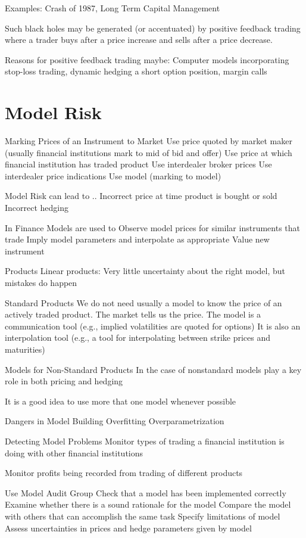 	Examples: Crash of 1987, Long Term Capital Management
	
	Such black holes may be generated (or accentuated) by positive feedback trading where a trader buys after a price increase and sells after a price decrease.
	
	Reasons for positive feedback trading maybe: Computer models incorporating stop-loss trading, dynamic hedging a short option position, margin calls


\section{Model Risk}

Marking Prices of an Instrument to Market
	Use price quoted by market maker (usually financial institutions mark to mid of bid and offer)
	Use price at which financial institution has traded product
	Use interdealer broker prices
	Use interdealer price indications
	Use model (marking to model)


Model Risk can lead to ..
	Incorrect price at time product is bought or sold
	Incorrect hedging


In Finance Models are used to 
	Observe model prices for similar instruments that trade
	Imply model parameters and interpolate as appropriate
	Value new instrument


Products
	Linear products: Very little uncertainty about the right model, but mistakes do happen
	
	Standard Products
		We do not need usually a model to know the price of an actively traded product. The market tells us the price.
		The model is a communication tool (e.g., implied volatilities are quoted for options)
		It is also an interpolation tool (e.g., a tool for interpolating between strike prices and maturities)


Models for Non-Standard Products
	In the case of nonstandard models play a key role in both pricing and hedging
	
	It is a good idea to use more that one model whenever possible


Dangers in Model Building
	Overfitting
	Overparametrization


Detecting Model Problems
	Monitor types of trading a financial institution is doing with other financial institutions
	
	Monitor profits being recorded from trading of different products
	
	Use Model Audit Group
		Check that a model has been implemented correctly
		Examine whether there is a sound rationale for the model
		Compare the model with others that can accomplish the same task
		Specify limitations of model
		Assess uncertainties in prices and hedge parameters given by model